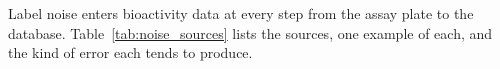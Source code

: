 % 
% 
% 

Label noise enters bioactivity data at every step from the assay plate to the database. Table~\ref{tab:noise_sources} lists the sources, one example of each, and the kind of error each tends to produce.

